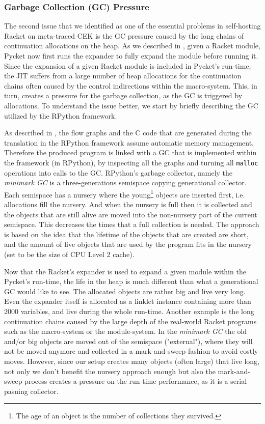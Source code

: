 \subsubsection{Garbage Collection (GC) Pressure}

The second issue that we identified as one of the essential problems
in self-hosting Racket on meta-traced CEK is the GC pressure caused by
the long chains of continuation allocations on the heap. As we
described in , given a Racket module, Pycket now
first runs the expander to fully expand the module before running
it. Since the expansion of a given Racket module is included in
Pycket's run-time, the JIT suffers from a large number of heap
allocations for the continuation chains often caused by the control
indirections within the macro-system. This, in turn, creates a
pressure for the garbage collection, as the GC is triggered by
allocations. To understand the issue better, we start by briefly
describing the GC utilized by the RPython framework.

As described in , the flow graphs and the C
code that are generated during the translation in the RPython
framework assume automatic memory management. Therefore the produced
program is linked with a GC that is implemented within the framework
(in RPython), by inspecting all the graphs and turning all
\texttt{malloc} operations into calls to the GC. RPython's garbage
collector, namely the \emph{minimark GC} is a three-generations
semispace copying generational collector. Each semispace has a nursery
where the young\footnote{The age of an object is the number of
  collections they survived.}  objects are inserted first,
i.e. allocations fill the nursery. And when the nursery is full then
it is collected and the objects that are still alive are moved into
the non-nursery part of the current semispace. This decreases the
times that a full collection is needed. The approach is based on the
idea that the lifetime of the objects that are created are short, and
the amount of live objects that are used by the program fits in the
nursery (set to be the size of CPU Level 2 cache). \cite{pypy06,
  bolz:14, gc:16, gc:12}

Now that the Racket's expander is used to expand a given module within
the Pycket's run-time, the life in the heap is much different than
what a generational GC would like to see. The allocated objects are
rather big and live very long. Even the expander itself is allocated
as a linklet instance containing more than 2000 variables, and live
during the whole run-time. Another example is the long continuation
chains caused by the large depth of the real-world Racket programs
such as the macro-system or the module-system. In the \emph{minimark
  GC} the old and/or big objects are moved out of the semispace
("external"), where they will not be moved anymore and collected in a
mark-and-sweep fashion to avoid costly moves. However, since our setup
creates many objects (often large) that live long, not only we don't
benefit the nursery approach enough but also the mark-and-sweep
process creates a pressure on the run-time performance, as it is a
serial pasuing collector.


